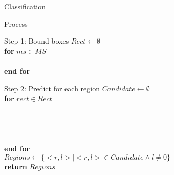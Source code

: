 \documentclass[xcolor=table,compress,blue]{beamer}
\begin{document}
\begin{frame}{Classification}
	\vspace{-7pt}
	\begin{exampleblock}{Process}
	\end{exampleblock}
	\vspace{-17pt}
	\begin{exampleblock}{\small Step 1: Bound boxes}
		$Rect \leftarrow \emptyset$
		\\ \textbf{for} {$ms \in MS$}
		\\ 
		\\ \textbf{end for}
	\end{exampleblock}
	\vspace{-11pt}
	\begin{exampleblock}{\small Step 2: Predict for each region}
		 {$Candidate \leftarrow \emptyset$}
		\\ \textbf{for} {$rect \in Rect$}
		\\ 
		\\ 
		\\ 
		\\ 
		\\ \textbf{end for}
		\\ {$Regions \leftarrow \{<r,l>|<r,l> \in Candidate \wedge l \neq 0\}$}
		\\ \textbf{return} $Regions$
	\end{exampleblock}
\end{frame}
\end{document}
